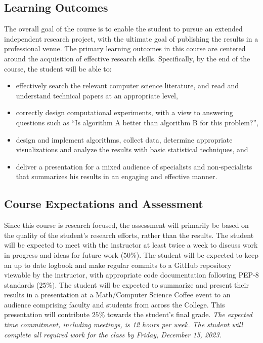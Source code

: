 \documentclass[12pt]{article}
\begin{document}
\subsection*{Learning Outcomes}

The overall goal of the course is to enable the student to pursue an extended
independent research project, with the ultimate goal of publishing the results
in a professional venue. The primary learning outcomes in this course are
centered around the acquisition of effective research skills. Specifically, by
the end of the course, the student will be able to:

\begin{itemize}
\item effectively search the relevant computer science literature, and
  read and understand technical papers at an appropriate level,
\item correctly design computational experiments, with a view to
  answering questions such as ``Is algorithm A better than algorithm B
  for this problem?'',
\item design and implement algorithms, collect data, determine
  appropriate visualizations and analyze the results with basic
  statistical techniques, and
\item deliver a presentation for a mixed audience of specialists
  and non-specialists that summarizes his results in an engaging and
  effective manner.
\end{itemize}


\subsection*{Course Expectations and Assessment}

Since this course is research focused, the assessment will primarily be based on
the quality of the student's research efforts, rather than the results. The
student will be expected to meet with the instructor at least twice a week to
discuss work in progress and ideas for future work ($50\%$). The student will be
expected to keep an up to date logbook and make regular commits to a GitHub
repository viewable by the instructor, with appropriate code documentation
following PEP-8 standards ($25\%)$. The student will be expected to summarize
and present their results in a presentation at a Math/Computer Science Coffee
event to an audience comprising faculty and students from across the College.
This presentation will contribute $25\%$ towards the student's final grade.
\emph{The expected time commitment, including meetings, is 12 hours per week.
The student will complete all required work for the class by Friday, December
15, 2023.} 
\end{document}

